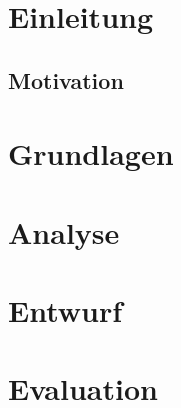 



 

 \tableofcontents
 

 \printglossary[title={Abkürzungsverzeichnis}] 
 
 \chapter{Einleitung}
 \section{Motivation}
 
 
 
 \chapter{Grundlagen}
 
 
  
  
 
 
 
 
 
 
 
 \chapter{Analyse}
 
 
 
 
 
 

 
 
 
 \chapter{Entwurf}
  
 
 
 
  
 \chapter{Evaluation}
 

